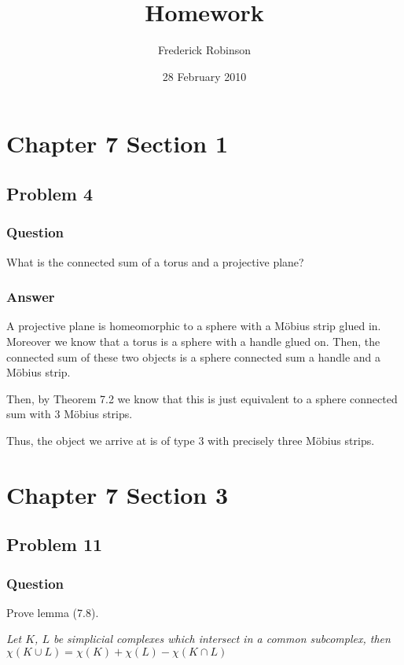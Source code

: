 \documentclass[10pt]{article}
\title{Homework}
\author{Frederick Robinson}
\date{28 February 2010}
\begin{document}

   \maketitle



\section{Chapter 7 Section 1}

\subsection{Problem 4}

\subsubsection{Question}
What is the connected sum of a torus and a projective plane?
\subsubsection{Answer}


A projective plane is homeomorphic to a sphere with a M\"{o}bius strip glued in. Moreover we know that a torus is a sphere with a handle glued on. Then, the connected sum of these two objects is a sphere connected sum a handle and a M\"{o}bius strip. 

Then, by Theorem 7.2 we know that this is just equivalent to  a sphere connected sum with 3 M\"{o}bius strips.

Thus, the object we arrive at is of type 3 with precisely three M\"{o}bius strips. 

\section{Chapter 7 Section 3}

\subsection{Problem 11}

\subsubsection{Question}
Prove lemma (7.8).

\emph{Let $K$, $L$ be simplicial complexes which intersect in a common subcomplex, then $\chi(K \cup L ) = \chi(K) + \chi(L) - \chi(K\cap L)$}
\end{document}
